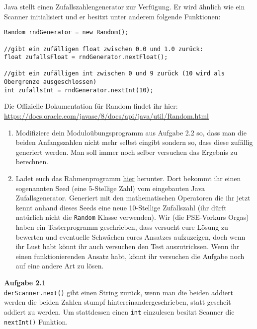 \documentclass{../../sheet}
\begin{document}
\newpage
{}
Java stellt einen Zufallszahlengenerator zur Verfügung. Er wird ähnlich wie ein Scanner initialisiert und er besitzt unter anderem folgende Funktionen:

\begin{verbatim}
Random rndGenerator = new Random();

//gibt ein zufälligen float zwischen 0.0 und 1.0 zurück:
float zufallsFloat = rndGenerator.nextFloat();

//gibt ein zufälligen int zwischen 0 und 9 zurück (10 wird als Obergrenze ausgeschlossen)
int zufallsInt = rndGenerator.nextInt(10);
\end{verbatim}
Die Offizielle Dokumentation für Random findet ihr hier: \url{https://docs.oracle.com/javase/8/docs/api/java/util/Random.html}

\begin{enumerate}
    \item Modifiziere dein Moduloübungsprogramm aus Aufgabe 2.2 so, dass man die beiden Anfangszahlen nicht mehr selbst eingibt sondern so, dass diese zufällig generiert werden. Man soll immer noch selber versuchen das Ergebnis zu berechnen. 
    \item Ladet euch das Rahmenprogramm \href{https://fius.de/wp-content/uploads/2025/10/Day1Highperformer.zip}{hier} herunter. Dort bekommt ihr einen sogenannten Seed (eine 5-Stellige Zahl) vom eingebauten Java Zufallsgenerator. Generiert mit den mathematischen Operatoren die ihr jetzt kennt anhand dieses Seeds eine neue 10-Stellige Zufallszahl (ihr dürft natürlich nicht die \texttt{Random} Klasse verwenden). Wir (die PSE-Vorkurs Orgas) haben ein Testerprogramm geschrieben, dass versucht eure Lösung zu bewerten und eventuelle Schwächen eures Ansatzes aufzuzeigen, doch wenn ihr Lust habt könnt ihr auch versuchen den Test auszutricksen. Wenn ihr einen funktionierenden Ansatz habt, könnt ihr versuchen die Aufgabe noch auf eine andere Art zu lösen.   
\end{enumerate}

\newpage
{}
\hypertarget{Aufgabe_2.1}{}
\textbf{Aufgabe 2.1}\\
\texttt{derScanner.next()} gibt einen String zurück, wenn man die beiden addiert werden die beiden Zahlen stumpf hintereinandergeschrieben, statt gescheit addiert zu werden. Um stattdessen einen \texttt{int} einzulesen besitzt Scanner die \texttt{nextInt()} Funktion.
\end{document}
